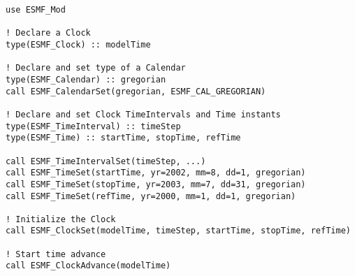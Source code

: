 
\begin{verbatim}
use ESMF_Mod

! Declare a Clock
type(ESMF_Clock) :: modelTime

! Declare and set type of a Calendar
type(ESMF_Calendar) :: gregorian
call ESMF_CalendarSet(gregorian, ESMF_CAL_GREGORIAN)

! Declare and set Clock TimeIntervals and Time instants
type(ESMF_TimeInterval) :: timeStep
type(ESMF_Time) :: startTime, stopTime, refTime

call ESMF_TimeIntervalSet(timeStep, ...)
call ESMF_TimeSet(startTime, yr=2002, mm=8, dd=1, gregorian)
call ESMF_TimeSet(stopTime, yr=2003, mm=7, dd=31, gregorian)
call ESMF_TimeSet(refTime, yr=2000, mm=1, dd=1, gregorian)

! Initialize the Clock
call ESMF_ClockSet(modelTime, timeStep, startTime, stopTime, refTime)

! Start time advance
call ESMF_ClockAdvance(modelTime)
\end{verbatim}


